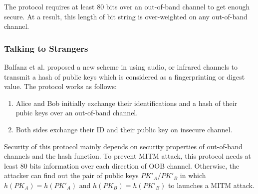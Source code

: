The protocol requires at least 80 bits over an out-of-band channel to get enough secure. At a result, this length of bit string is over-weighted on any out-of-band channel. 
 
\subsubsection{Talking to Strangers}

Balfanz et al. proposed a new scheme in \cite{Smetters02talkingto} using audio, or infrared channels to transmit a hash of public keys which is considered as a fingerprinting or digest value. The protocol works as follows:
\begin{enumerate}
\item Alice and Bob initially exchange their identifications and a hash of their pubic keys over an out-of-band channel.
\item Both sides exchange their ID and their public key on insecure channel. 
\end{enumerate}

\begin{center}
\end{center}

Security of this protocol mainly depends on security properties of out-of-band channels and the hash function. To prevent MITM attack, this protocol needs at least 80 bits information over each direction of OOB channel. Otherwise, the attacker can find out the pair of public keys $PK'_A/PK'_B$ in which $h(PK_A) = h(PK'_A)$ and $h(PK_B) = h(PK'_B)$ to launches a MITM attack.

